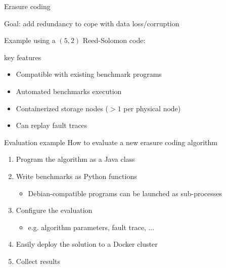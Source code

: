 \begin{frame}{Erasure coding}
    \begin{snugshade}
        Goal: add redundancy to cope with data loss/corruption
    \end{snugshade}

    Example using a $\left(5,2\right)$ Reed-Solomon code:
    \begin{figure}
    
    \end{figure}
\end{frame}

\subtitle{Description}

\begin{frame}{\sys \enspace key features}
    \begin{itemize}
        \item Compatible with existing benchmark programs
        \item Automated benchmarks execution
        \item Containerized storage nodes ($>1$ per physical node)
        \item Can replay fault traces
    \end{itemize}
\end{frame}

\begin{frame}{Evaluation example}
    How to evaluate a new erasure coding algorithm
    \begin{enumerate}
        \item Program the algorithm as a Java class
        \item Write benchmarks as Python functions
        \begin{itemize}
            \item Debian-compatible programs can be launched as sub-processes
        \end{itemize}
        \item Configure the evaluation
        \begin{itemize}
            \item e.g. algorithm parameters, fault trace, ...
        \end{itemize}
        \item Easily deploy the solution to a Docker cluster
        \item Collect results
    \end{enumerate}
\end{frame}

\subtitle[Architecture]{Architecture}

